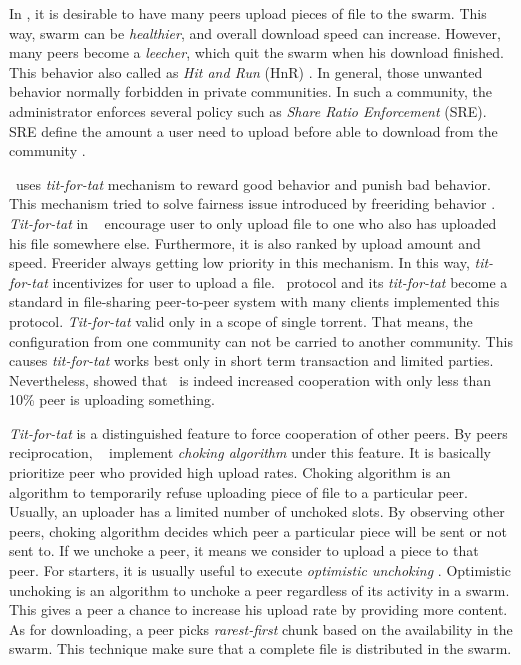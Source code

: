 In \bt, it is desirable to have many peers upload pieces of file to the swarm. This way, swarm can be \textit{healthier}, and overall download speed can increase. However, many peers become a \textit{leecher}, which quit the swarm when his download finished. This behavior also called as \textit{Hit and Run} (HnR) \cite{2014:sustainabilitytorrent:chen}. In general, those unwanted behavior normally forbidden in private communities. In such a community, the administrator enforces several policy such as \textit{Share Ratio Enforcement} (SRE). SRE define the amount a user need to upload before able to download from the community \cite{2012:economicbt:kash}. 

\bt~uses \textit{tit-for-tat} mechanism to reward good behavior and punish bad behavior. This mechanism tried to solve fairness issue introduced by freeriding behavior \cite{2003:bittorrent:cohen}. \textit{Tit-for-tat} in \bt~ encourage user to only upload file to one who also has uploaded his file somewhere else. Furthermore, it is also ranked by upload amount and speed. Freerider always getting low priority in this mechanism. In this way, \textit{tit-for-tat} incentivizes for user to upload a file. \bt~protocol and its \textit{tit-for-tat} become a standard in file-sharing peer-to-peer system with many clients implemented this protocol. \textit{Tit-for-tat} valid only in a scope of single torrent. That means, the configuration from one community can not be carried to another community. This causes \textit{tit-for-tat} works best only in short term transaction and limited parties. Nevertheless, \citeauthor{2005:bittorrentcooperation:andrade} showed that \bt~is indeed increased cooperation with only less than 10\% peer is uploading something.

\textit{Tit-for-tat} is a distinguished feature to force cooperation of other peers. By peers reciprocation, \bt~ implement \textit{choking algorithm} under this feature. It is basically prioritize peer who provided high upload rates. Choking algorithm is an algorithm to temporarily refuse uploading piece of file to a particular peer. Usually, an uploader has a limited number of unchoked slots. By observing other peers, choking algorithm decides which peer a particular piece will be sent or not sent to. If we unchoke a peer, it means we consider to upload a piece to that peer. For starters, it is usually useful to execute \textit{optimistic unchoking} \cite{2003:bittorrent:cohen}. Optimistic unchoking is an algorithm to unchoke a peer regardless of its activity in a swarm. This gives a peer a chance to increase his upload rate by providing more content. As for downloading, a peer picks \textit{rarest-first} chunk based on the availability in the swarm. This technique make sure that a complete file is distributed in the swarm.


